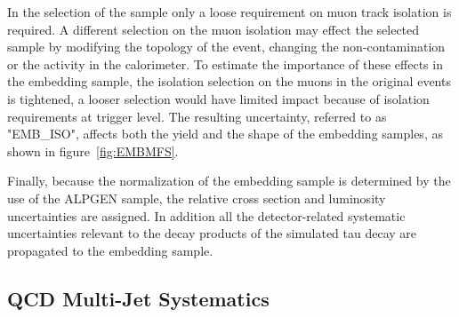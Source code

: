 %
%	
%

In the selection of the \Zmumu sample only a loose requirement on muon track isolation is required.
A different selection on the muon isolation may effect the selected sample by modifying the topology of the event, 
changing the non-\Zmumu contamination or the activity in the calorimeter. 
To estimate  the importance of these effects in the
embedding sample, the isolation selection on the muons in the original \Zmumu events is tightened,
a looser selection would have limited impact because of isolation requirements at trigger level.
The resulting uncertainty, referred to as "EMB\_ISO", affects both the yield and the \mmc shape of 
the embedding samples, as shown in figure~\ref{fig:EMBMFS}. 

Finally, because the normalization of the embedding sample is determined by the use of the ALPGEN sample, 
the relative cross section and luminosity uncertainties are assigned. In addition
all the detector-related systematic uncertainties relevant to the decay products of the simulated tau 
decay are propagated to the embedding sample.
 

\subsection{QCD Multi-Jet Systematics}\label{sec:qcdsys}

